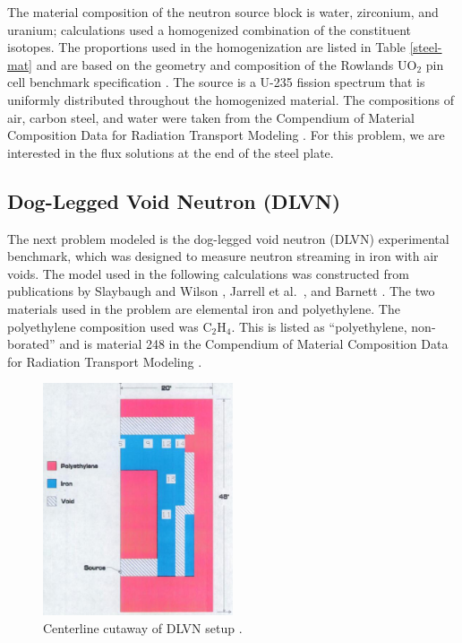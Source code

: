 \documentclass{article} %
\begin{document}
The material composition of the neutron source block is water, zirconium, and
uranium; calculations used a homogenized combination of the constituent
isotopes. The proportions used in the homogenization are listed in Table
\ref{steel-mat} and are based on the geometry and composition of the Rowlands
UO$_2$ pin cell benchmark specification \cite{pincell}. The source is a U-235
fission spectrum that is uniformly distributed throughout the homogenized
material. The compositions of air, carbon steel, and water were taken from the
Compendium of Material Composition Data for Radiation Transport Modeling
\cite{pnnl}. For this problem, we are interested in the flux solutions at the
end of the steel plate.

\subsection{Dog-Legged Void Neutron (DLVN)}

The next problem modeled is the dog-legged void neutron (DLVN) experimental
benchmark, which was designed to measure neutron streaming in iron with air
voids. The model used in the following calculations was constructed from
publications by Slaybaugh and Wilson \cite{sw-dlvn}, Jarrell et al.\
\cite{j-dlvn}, and Barnett \cite{dlvn1991}. The two materials used in the
problem are elemental iron and polyethylene. The polyethylene composition used
was C$_2$H$_4$. This is listed as ``polyethylene, non-borated'' and is
material 248 in the Compendium of Material Composition Data for Radiation
Transport Modeling \cite{pnnl}.

\begin{figure}[!htb]
\centering
\includegraphics[width=0.5\textwidth]{dlvn.png}
\caption{Centerline cutaway of DLVN setup \cite{sw-dlvn}.}
\label{dlvn}
\end{figure}
\end{document}
